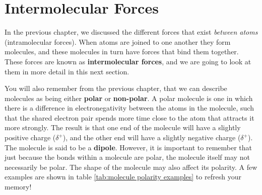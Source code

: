 \chapter{Intermolecular Forces}
\label{chap:intermolecular}

In the previous chapter, we discussed the different forces that exist \textit{between atoms} (intramolecular forces). When atoms are joined to one another they form molecules, and these molecules in turn have forces that bind them together. These forces are known as \textbf{intermolecular forces}, and we are going to look at them in more detail in this next section.


You will also remember from the previous chapter, that we can describe molecules as being either \textbf{polar} or \textbf{non-polar}. A polar molecule is one in which there is a difference in electronegativity between the atoms in the molecule, such that the shared electron pair spends more time close to the atom that attracts it more strongly. The result is that one end of the molecule will have a slightly positive charge ($\delta^{+}$), and the other end will have a slightly negative charge ($\delta^{+}$). The molecule is said to be a \textbf{dipole}. However, it is important to remember that just because the bonds within a molecule are polar, the molecule itself may not necessarily be polar. The shape of the molecule may also affect its polarity. A few examples are shown in table \ref{tab:molecule polarity examples} to refresh your memory!

